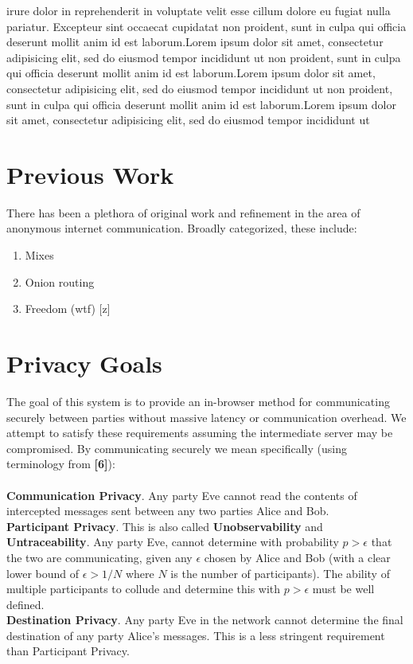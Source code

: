 \documentclass{paper}
\begin{document}
irure dolor in reprehenderit in voluptate velit esse cillum dolore eu fugiat nulla pariatur. Excepteur sint occaecat cupidatat non proident, sunt in culpa qui officia deserunt mollit anim id est laborum.Lorem ipsum dolor sit amet, consectetur adipisicing elit, sed do eiusmod tempor incididunt ut non proident, sunt in culpa qui officia deserunt mollit anim id est laborum.Lorem ipsum dolor sit amet, consectetur adipisicing elit, sed do eiusmod tempor incididunt ut non proident, sunt in culpa qui officia deserunt mollit anim id est laborum.Lorem ipsum dolor sit amet, consectetur adipisicing elit, sed do eiusmod tempor incididunt ut
\section{Previous Work}
There has been a plethora of original work and refinement in the area of anonymous internet communication. Broadly categorized, these include:
\begin{enumerate}
  \item Mixes \cite{chaum-mix} 
  \item Onion routing \cite{onion-discex00}
  \item Freedom (wtf) [z]
\end{enumerate}
\section{Privacy Goals}
  The goal of this system is to provide an in-browser method for communicating securely between parties without massive latency or communication overhead. We attempt to satisfy these requirements assuming the intermediate server may be compromised. By communicating securely we mean specifically (using terminology from \textbf{[6]}):
  \\\\\textbf{Communication Privacy}. Any party Eve cannot read the contents of intercepted messages sent between any two parties Alice and Bob. 
  \\\textbf{Participant Privacy}. This is also called \textbf{Unobservability} and \textbf{Untraceability}. Any party Eve, cannot determine with probability $p > \epsilon$ that the two are communicating, given any $\epsilon$ chosen by Alice and Bob (with a clear lower bound of $\epsilon > 1/N$ where $N$ is the number of participants). The ability of multiple participants to collude and determine this with $p > \epsilon$ must be well defined.
  \\\textbf{Destination Privacy}. Any party Eve in the network cannot determine the final destination of any party Alice's messages. This is a less stringent requirement than Participant Privacy.
\end{document}
